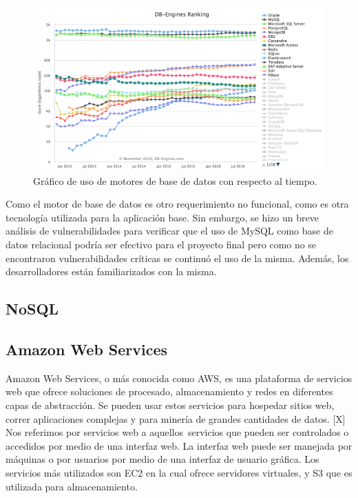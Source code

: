 \begin{figure}[H]
\centering
\includegraphics[width=125mm,scale=1]{Figuras/tecnologias/rank_db_2}
\caption{Gráfico de uso de motores de base de datos con respecto al tiempo.}
  \label{graph_db_2}
\end{figure}

Como el motor de base de datos es otro requerimiento no funcional, como es otra tecnología utilizada para la aplicación base. Sin embargo, se hizo un breve análisis de vulnerabilidades para verificar que el uso de MySQL como base de datos relacional podría ser efectivo para el proyecto final pero como no se encontraron vulnerabilidades críticas se continuó el uso de la misma. Además, los desarrolladores están familiarizados con la misma.

\subsection{NoSQL}

\subsection{Amazon Web Services}
Amazon Web Services, o más conocida como AWS, es una plataforma de servicios web que ofrece soluciones de procesado, almacenamiento y redes en diferentes capas de abstracción. Se pueden usar estos servicios para hospedar sitios web, correr aplicaciones complejas y para minería de grandes cantidades de datos. [X] Nos referimos por servicios web a aquellos\ servicios que pueden ser controlados o accedidos por medio de una interfaz web. La interfaz web puede ser manejada por máquinas o por usuarios por medio de una interfaz de usuario gráfica. Los servicios más utilizados son EC2 en la cual ofrece servidores virtuales, y S3 que es utilizada para almacenamiento.

